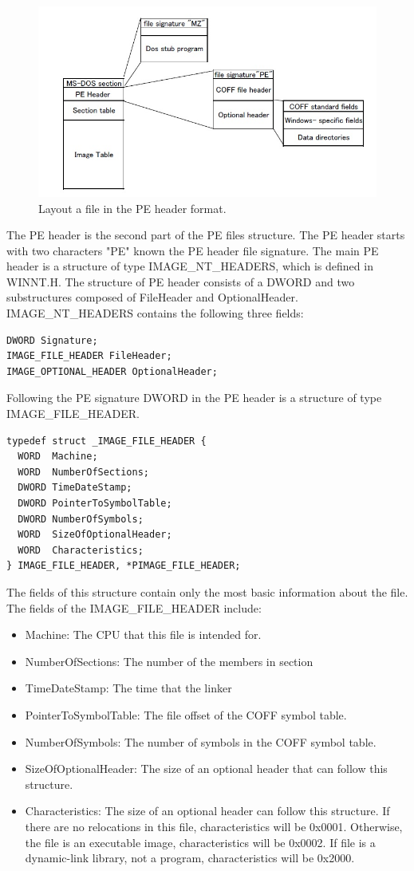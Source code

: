 \begin{figure}[httb]
\centering
\includegraphics[width=1\textwidth]{graph/peheader1.jpg}
\caption{Layout a file in the PE header format.}
\label{fig:peheader}
\end{figure}
The PE header is the second part of the PE files structure. The PE header starts with two characters "PE" known the PE header file signature. The main PE header is a structure of type IMAGE\_NT\_HEADERS, which is defined in WINNT.H. The structure of PE header consists of a DWORD and two substructures composed of FileHeader and OptionalHeader. IMAGE\_NT\_HEADERS contains the following three fields:
\begin{verbatim}
DWORD Signature;
IMAGE_FILE_HEADER FileHeader;
IMAGE_OPTIONAL_HEADER OptionalHeader;
\end{verbatim}
Following the PE signature DWORD in the PE header is a structure of type IMAGE\_FILE\_HEADER. 
\begin{verbatim}
typedef struct _IMAGE_FILE_HEADER {
  WORD  Machine;
  WORD  NumberOfSections;
  DWORD TimeDateStamp;
  DWORD PointerToSymbolTable;
  DWORD NumberOfSymbols;
  WORD  SizeOfOptionalHeader;
  WORD  Characteristics;
} IMAGE_FILE_HEADER, *PIMAGE_FILE_HEADER;
\end{verbatim}
The fields of this structure contain only the most basic information about the file. The fields of the IMAGE\_FILE\_HEADER include:
\begin{itemize}
\item Machine: The CPU that this file is intended for.
\item NumberOfSections: The number of the members in section
\item TimeDateStamp: The time that the linker
\item PointerToSymbolTable: The file offset of the COFF symbol table. 
\item NumberOfSymbols: The number of symbols in the COFF symbol table.
\item SizeOfOptionalHeader: The size of an optional header that can follow this structure.
\item Characteristics: The size of an optional header can follow this structure. If there are no relocations in this file, characteristics will be 0x0001. Otherwise, the file is an executable image, characteristics will be 0x0002.  If file is a dynamic-link library, not a program, characteristics will be 0x2000.
\end{itemize}

